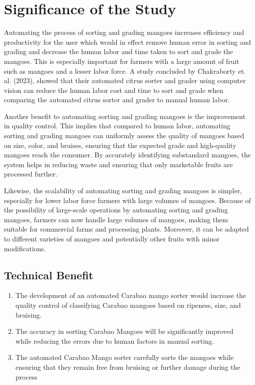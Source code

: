 
\section{Significance of the Study}

Automating the process of sorting and grading mangoes increases efficiency and 
productivity for the user which would in effect remove human error in sorting and
 grading and decrease the human labor and time taken to sort and grade the mangoes.
  This is especially important for farmers with a large amount of fruit such as mangoes and a
   lesser labor force. A study concluded by Chakraborty et. al. (2023), showed that
    their automated citrus sorter and grader using computer vision can reduce the human
	 labor cost and time to sort and grade when comparing the automated citrus sorter and grader
	  to manual human labor. 

Another benefit to automating sorting and grading mangoes is the improvement in quality control.
 This implies that compared to human labor, automating sorting and grading mangoes can uniformly 
 assess the quality of mangoes based on size, color, and bruises, ensuring that the expected grade and
  high-quality mangoes reach the consumer. By accurately identifying substandard mangoes, the system 
  helps in reducing waste and ensuring that only marketable fruits are processed further.

Likewise, the scalability of automating sorting and grading mangoes is simpler, especially 
for lower labor force farmers with large volumes of mangoes. Because of the possibility of
 large-scale operations by automating sorting and grading mangoes, farmers can now handle large
  volumes of mangoes, making them suitable for commercial farms and processing plants. Moreover,
   it can be adapted to different varieties of mangoes and potentially other fruits with minor modifications.


\subsection{Technical Benefit}

\begin{enumerate}
	\item The development of an automated Carabao mango sorter would increase the quality control 
	of classifying Carabao mangoes based on ripeness, size, and bruising.
	
	\item The accuracy in sorting Carabao Mangoes will be significantly improved while
	 reducing the errors due to human factors in manual sorting.
	
	\item The automated Carabao Mango sorter carefully sorts the mangoes 
	while ensuring that they remain free from bruising or further damage during the process	
\end{enumerate}

